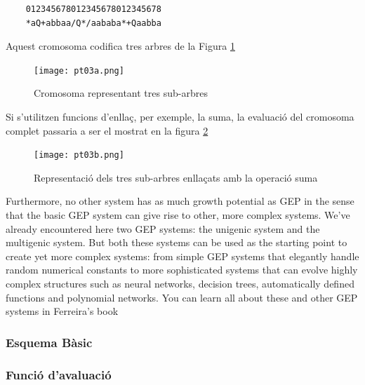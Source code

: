 \documentclass[titlepage,a4paper,12pt]{book}
\begin{document}
	\begin{center}
	\begin{verbatim}
	012345678012345678012345678 	 
	*aQ+abbaa/Q*/aababa*+Qaabba
	\end{verbatim}
	\end{center}


Aquest cromosoma codifica tres arbres de la Figura \ref{fig:tres sub-et}

\begin{figure}[h!]
\begin{center}
\texttt{[image: pt03a.png]}
\end{center}
\caption{Cromosoma representant tres sub-arbres}
\label{fig:tres sub-et}
\end{figure}

Si s'utilitzen funcions d'enllaç, per exemple, la suma, la evaluació del
cromosoma complet passaria a ser el mostrat en la figura 
\ref{fig:tres sub-et amb link}

\begin{figure}[h!]
\begin{center}
\texttt{[image: pt03b.png]}
\end{center}
\caption{Representació dels tres sub-arbres enllaçats amb la operació suma}
\label{fig:tres sub-et amb link}
\end{figure}


Furthermore, no other system has as much growth potential as GEP in the sense that the basic GEP system can give rise to other, more complex systems. We've already encountered here two GEP systems: the unigenic system and the multigenic system. But both these systems can be used as the starting point to create yet more complex systems: from simple GEP systems that elegantly handle random numerical constants to more sophisticated systems that can evolve highly complex structures such as neural networks, decision trees, automatically defined functions and polynomial networks. You can learn all about these and other GEP systems in Ferreira's book

\subsubsection{Esquema Bàsic} %
\label{ssub:Esquema Basic}

\subsubsection{Funció d'avaluació} %
\label{ssub:funcio d'avaluacio}
\end{document}
